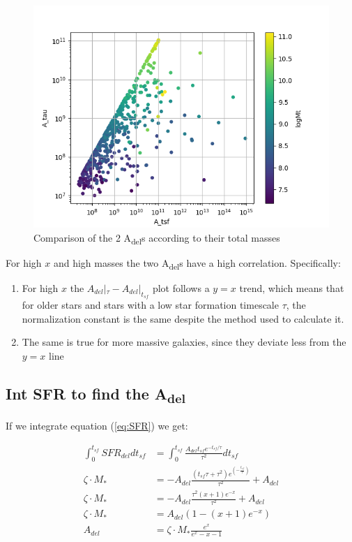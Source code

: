 \documentclass[a4paper,twocolumn]{article}
\begin{document}
\begin{figure}[!htpb]
\centering
\includegraphics[width=.9\linewidth]{./figs/A_tau-A_tsf_Mt.png}
\caption{\label{fig:Comparison of the 2 A_{del}s according to their total masses}Comparison of the 2 A\textsubscript{del}s according to their total masses}
\end{figure}

For high \(x\) and high masses the two A\textsubscript{del}s have a high correlation. Specifically:
\begin{enumerate}
\item For high \(x\) the \(A_{del}|_{\tau}-A_{del}|_{t_{sf}}\) plot follows a \(y=x\) trend, which means that for older stars and stars with a low star formation timescale \(\tau\), the normalization constant is the same despite the method used to calculate it.
\item The same is true for more massive galaxies, since they deviate less from the \(y=x\) line
\end{enumerate}


\subsection{Int SFR to find the A\textsubscript{del}}
\label{sec:org13c70a8}

If we integrate equation (\ref{eq:SFR}) we get:


\begin{equation}\label{eq:int SFR}
\begin{align}
\int^{t_{sf}}_0 SFR_{del} dt_{sf}&=\int^{t_{sf}}_0 \frac{A_{del}t_{sf}e^{-t_{sf}/\tau}}{\tau^2} dt_{sf}\\
\zeta\cdot M_*&=-A_{del} \frac{{\left(t_{\mathit{sf}} \tau + \tau^{2}\right)} e^{\left(-\frac{t_{\mathit{sf}}}{\tau}\right)}}{\tau^{2}}+A_{del}\\
\zeta\cdot M_*&=-A_{del}\frac{\tau^2(x+1)e^{-x}}{\tau^2}+A_{del}\\
\zeta\cdot M_*& = A_{del}(1-(x+1)e^{-x})\\
A_{del}&=\zeta\cdot M_*\frac{e^x}{e^x-x-1}
\end{align}
\end{equation}
\end{document}
